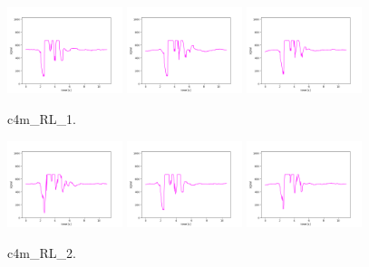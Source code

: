 \begin{figure}[!ht]
\begin{center}
\includegraphics[width=0.3\textwidth]{../data/c4m_RL_1/c4m_RL_1_1.png}
\includegraphics[width=0.3\textwidth]{../data/c4m_RL_1/c4m_RL_1_2.png}
\includegraphics[width=0.3\textwidth]{../data/c4m_RL_1/c4m_RL_1_3.png}
\caption{c4m\_RL\_1.\label{fig:c4m_RL_1}}
\end{center}
\end{figure}

\begin{figure}[!ht]
\begin{center}
\includegraphics[width=0.3\textwidth]{../data/c4m_RL_2/c4m_RL_2_1.png}
\includegraphics[width=0.3\textwidth]{../data/c4m_RL_2/c4m_RL_2_2.png}
\includegraphics[width=0.3\textwidth]{../data/c4m_RL_2/c4m_RL_2_3.png}
\caption{c4m\_RL\_2.\label{fig:c4m_RL_2}}
\end{center}
\end{figure}

